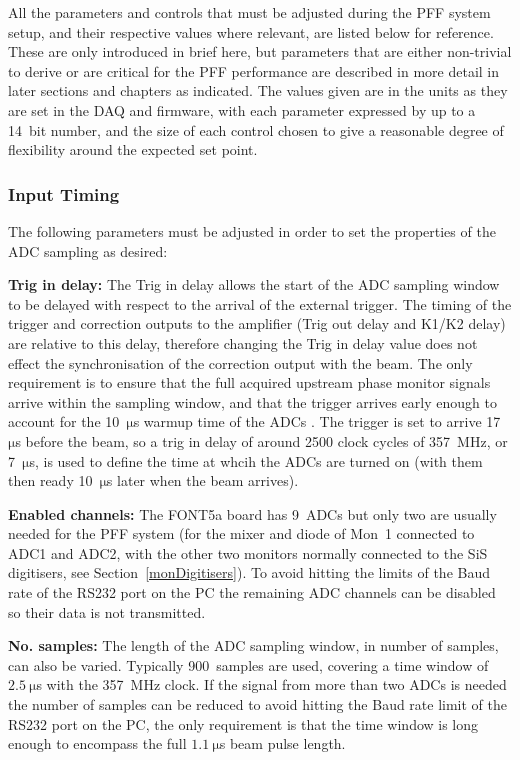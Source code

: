 All the parameters and controls that must be adjusted during the PFF system setup, and their respective values where relevant, are listed below for reference. These are only introduced in brief here, but parameters that are either non-trivial to derive or are critical for the PFF performance are described in more detail in later sections and chapters as indicated. The values given are in the units as they are set in the DAQ and firmware, with each parameter expressed by up to a 14~bit number, and the size of each control chosen to give a reasonable degree of flexibility around the expected set point. 

\subsubsection{Input Timing}

The following parameters must be adjusted in order to set the properties of the ADC sampling as desired:

\textbf{Trig in delay:} The Trig in delay allows the start of the ADC sampling window to be delayed with respect to the arrival of the external trigger. The timing of the trigger and correction outputs to the amplifier (Trig out delay and K1/K2 delay) are relative to this delay, therefore changing the Trig in delay value does not effect the synchronisation of the correction output with the beam. The only requirement is to ensure that the full acquired upstream phase monitor signals arrive within the sampling window, and that the trigger arrives early enough to account for the 10~\(\mathrm{\mu}\)s warmup time of the ADCs \cite{glennPriv}. The trigger is set to arrive 17~\(\mathrm{\mu}\)s before the beam, so a trig in delay of around 2500 clock cycles of 357~MHz, or 7~\(\mathrm{\mu}\)s, is used to define the time at whcih the ADCs are turned on (with them then ready 10~\(\mathrm{\mu}\)s later when the beam arrives).

\textbf{Enabled channels:} The FONT5a board has 9~ADCs but only two are usually needed for the PFF system (for the mixer and diode of Mon~1 connected to ADC1 and ADC2, with the other two monitors normally connected to the SiS digitisers, see Section~\ref{monDigitisers}). To avoid hitting the limits of the Baud rate  of the RS232 port on the PC the remaining ADC channels can be disabled so their data is not transmitted.

\textbf{No. samples:} The length of the ADC sampling window, in number of samples, can also be varied. Typically 900~samples are used, covering a time window of \(2.5~\mathrm{\mu}\)s with the 357~MHz clock. If the signal from more than two ADCs is needed the number of samples can be reduced to avoid hitting the Baud rate limit of the RS232 port on the PC, the only requirement is that the time window is long enough to encompass the full \(1.1~\mathrm{\mu}\)s beam pulse length.

